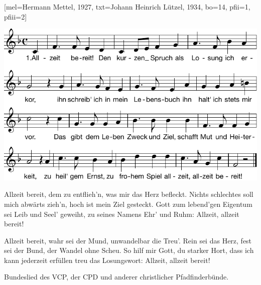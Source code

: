 [mel={Hermann Mettel, 1927}, txt={Johann Heinrich Lützel, 1934}, bo={14}, pfii={1}, pfiii={2}]

\markboth{\songtitle}{\songtitle}

\beginverse 
\endverse  

\centering\includegraphics[width=1\textwidth]{Noten/Lied003.pdf}	

\beginverse
Allzeit bereit, dem zu entflieh'n, was mir das Herz befleckt.
Nichts schlechtes soll mich abwärts zieh'n, hoch ist mein Ziel gesteckt.
Gott zum lebend'gen Eigentum sei Leib und Seel' geweiht,
zu seines Namens Ehr' und Ruhm: Allzeit, allzeit bereit!
\endverse

\beginverse
Allzeit bereit, wahr sei der Mund, unwandelbar die Treu'.
Rein sei das Herz, fest sei der Bund, der Wandel ohne Scheu.
So hilf mir Gott, du starker Hort, dass ich kann jederzeit
erfüllen treu das Losungswort: Allzeit, allzeit bereit!
\endverse


\endsong

\beginscripture{}
Bundeslied des VCP, der CPD und anderer christlicher Pfadfinderbünde.
\endscripture

\begin{intersong}

\end{intersong}